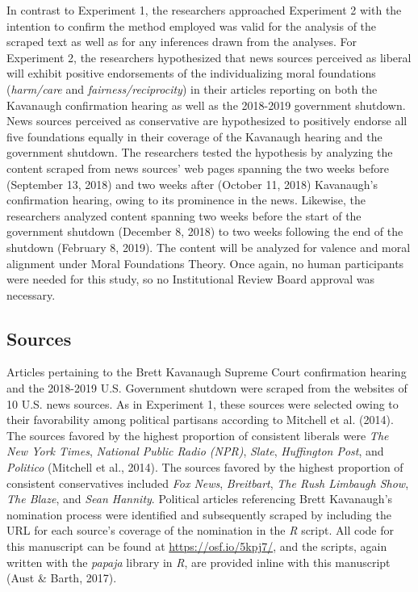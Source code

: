 \documentclass[english,,man]{apa6}
\begin{document}
In contrast to Experiment 1, the researchers approached Experiment 2 with the intention to confirm the method employed was valid for the analysis of the scraped text as well as for any inferences drawn from the analyses. For Experiment 2, the researchers hypothesized that news sources perceived as liberal will exhibit positive endorsements of the individualizing moral foundations (\emph{harm/care} and \emph{fairness/reciprocity}) in their articles reporting on both the Kavanaugh confirmation hearing as well as the 2018-2019 government shutdown. News sources perceived as conservative are hypothesized to positively endorse all five foundations equally in their coverage of the Kavanaugh hearing and the government shutdown. The researchers tested the hypothesis by analyzing the content scraped from news sources' web pages spanning the two weeks before (September 13, 2018) and two weeks after (October 11, 2018) Kavanaugh's confirmation hearing, owing to its prominence in the news. Likewise, the researchers analyzed content spanning two weeks before the start of the government shutdown (December 8, 2018) to two weeks following the end of the shutdown (February 8, 2019). The content will be analyzed for valence and moral alignment under Moral Foundations Theory. Once again, no human participants were needed for this study, so no Institutional Review Board approval was necessary.

\hypertarget{sources-1}{%
\subsection{Sources}\label{sources-1}}

Articles pertaining to the Brett Kavanaugh Supreme Court confirmation hearing and the 2018-2019 U.S. Government shutdown were scraped from the websites of 10 U.S. news sources. As in Experiment 1, these sources were selected owing to their favorability among political partisans according to Mitchell et al. (2014). The sources favored by the highest proportion of consistent liberals were \emph{The New York Times}, \emph{National Public Radio (NPR)}, \emph{Slate}, \emph{Huffington Post}, and \emph{Politico} (Mitchell et al., 2014). The sources favored by the highest proportion of consistent conservatives included \emph{Fox News}, \emph{Breitbart}, \emph{The Rush Limbaugh Show}, \emph{The Blaze}, and \emph{Sean Hannity}. Political articles referencing Brett Kavanaugh's nomination process were identified and subsequently scraped by including the URL for each source's coverage of the nomination in the \emph{R} script. All code for this manuscript can be found at \url{https://osf.io/5kpj7/}, and the scripts, again written with the \emph{papaja} library in \emph{R}, are provided inline with this manuscript (Aust \& Barth, 2017).
\end{document}
